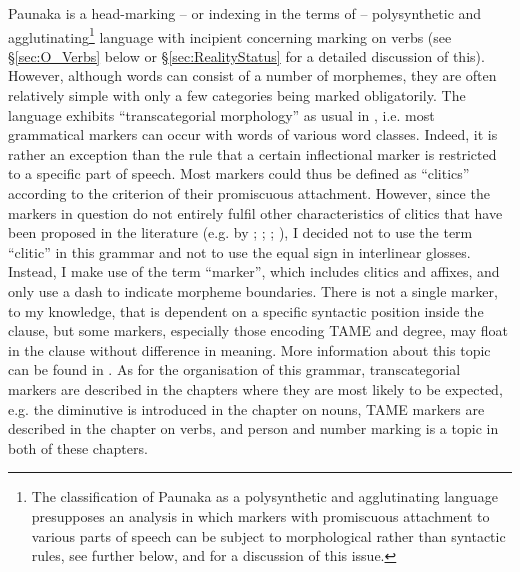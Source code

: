 Paunaka is a head-marking – or indexing in the terms of \citet[][]{Haspelmath2019} – polysynthetic and agglutinating\footnote{The classification of Paunaka as a polysynthetic and agglutinating language presupposes an analysis in which markers with promiscuous attachment to various parts of speech can be subject to morphological rather than syntactic rules, see further below, and  for a discussion of this issue.}  language with incipient  concerning  marking on verbs (see §\ref{sec:O_Verbs} below or §\ref{sec:RealityStatus} for a detailed discussion of this).  However, although words can consist of a number of morphemes, they are often relatively simple with only a few categories being marked obligatorily. The language exhibits “transcategorial morphology” \citep[73]{Rose2014a} as usual in  \citep[cf.][13]{Overall2018}, i.e. most grammatical markers can occur with words of various word classes. Indeed, it is rather an exception than the rule that a certain inflectional marker is restricted to a specific part of speech. Most markers could thus be defined as “clitics” according to the criterion of their promiscuous attachment. However, since the markers in question do not entirely fulfil other characteristics of clitics that have been proposed in the literature (e.g. by \citealt{ZwickyPullum1983}; \citealt{Sadock1991}; \citealt{Aikhenvald2003b}; \citealt{SpencerLuis2012}), I decided not to use the term “clitic” in this grammar and not to use the equal sign in interlinear glosses. Instead, I make use of the term “marker”, which includes clitics and affixes, and only use a dash to indicate morpheme boundaries. There is not a single marker, to my knowledge, that is dependent on a specific syntactic position inside the clause, but some markers, especially those encoding TAME and degree, may float in the clause without difference in meaning.  More information about this topic can be found in . As for the organisation of this grammar, transcategorial markers are described in the chapters where they are most likely to be expected, e.g. the diminutive is introduced in the chapter on nouns, TAME markers are described in the chapter on verbs, and person and number marking is a topic in both of these chapters.

